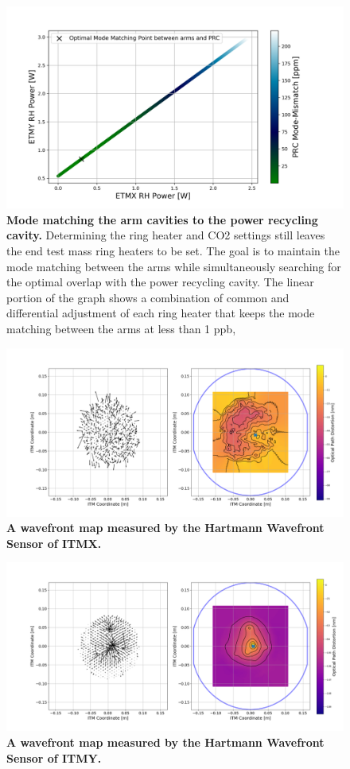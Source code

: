 \begin{figure}[ht]
\centering
\includegraphics[width=1.0 \textwidth]{../Figures/ETM_TCS_Settings.png}
\caption[Mode matching the arm cavities to the power recycling cavity.]{
	\textbf{Mode matching the arm cavities to the power recycling cavity.}  Determining the ring heater and CO2 settings still leaves the end test mass ring heaters to be set.  The goal is to maintain the mode matching between the arms while simultaneously searching for the optimal overlap with the power recycling cavity. The linear portion of the graph shows a combination of common and differential adjustment of each ring heater that keeps the mode matching between the arms at less than 1 ppb, }
\label{fig:TCS_ETM}
\end{figure}

\begin{figure}[ht]
	\centering
	\includegraphics[width=.7 \textwidth]{../Figures/ITMX_20W_abs.png}
	\caption[A wavefront map measured by the Hartmann Wavefront Sensor of ITMX.]  
	{\textbf{A wavefront map measured by the Hartmann Wavefront Sensor of ITMX.}}
	\label{fig:ITMX_WF}
\end{figure}

\begin{figure}[ht]
	\centering
	\includegraphics[width=.7 \textwidth]{../Figures/ITMY_20W_abs.png}
	\caption[A wavefront map measured by the Hartmann Wavefront Sensor of ITMY.]  
	{\textbf{A wavefront map measured by the Hartmann Wavefront Sensor of ITMY.}}
	\label{fig:ITMY_WF}
\end{figure}
